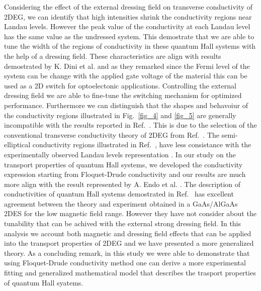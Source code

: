 Considering the effect of the external dressing field on transverse conductivity of 2DEG, we can identify that high intensities shrink the conductivity regions near Landau levels. However the peak value of the conductivity at each Landau level has the same value as the undressed system. This demostrate that we are able to tune the width of the regions of conductivity in these quantum Hall systems with the help of a dressing field.
These characteristics are align with results demostrated by K. Dini et al.\cite{dini16} and as they remarked since the Fermi level of the system can be change with the applied gate voltage of the material this can be used as a 2D switch for optoelectonic applications. Controlling  the external dressing field we are able to fine-tune the switching mechanism for optimized performance.
Furthermore we can distinguish that the shapes and behavoiur of the conductivity regions illustrated in Fig.~\ref{fig_4} and \ref{fig_5} are generally incompatible with the results reported in Ref.~\cite{dini16}. This is due to the selection of the conventional transverse conductivity theory of 2DEG from Ref.~\cite{ando74_1,ando82}. The semi-elliptical conductivity regions illustrated in Ref.~\cite{dini16,ando74_1,ando82}, have less consistance with the experimentally observed Landau levels representation \cite{endo09}.
In our study on the transport properties of quantum Hall systems, we developed the conductivity expression starting from Floquet-Drude conductivity \cite{wackerl20} and our results are much more align with the result represented by A. Endo et al. \cite{endo09}.
The description of conductivities of quantum Hall systems demostrated in Ref.~\cite{endo09} has excellent agreement between the theory and experiment obtained in a GaAs/AlGaAs 2DES for the low magnetic field range. However they have not consider about the tunability that can be achived with the external strong dressing field. In this analysis we account both magnetic and dressing field effects that can be applied into the transport properties of 2DEG and we have presented a more generalized theory. As a concluding remark, in this study we were able to demonstrate that using Floquet-Drude conductivity method one can derive a more experimental fitting and generalized mathematical model that describes the trasport properties of quantum Hall syatems.
